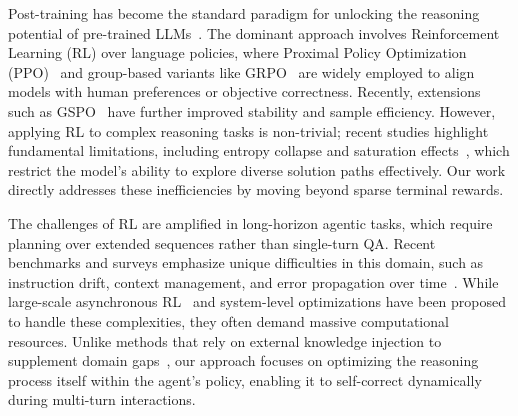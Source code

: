 \documentclass{article}
\theoremstyle{plain}
\theoremstyle{definition}
\theoremstyle{remark}
\begin{document}
Post-training has become the standard paradigm for unlocking the reasoning potential of pre-trained LLMs~\cite{openai2024gpt4technicalreport,llama3herdmodels}. The dominant approach involves Reinforcement Learning (RL) over language policies, where Proximal Policy Optimization (PPO)~\cite{proximalpolicyoptimizationalgorithms} and group-based variants like GRPO~\cite{deepseekmath} are widely employed to align models with human preferences or objective correctness. Recently, extensions such as GSPO~\cite{groupsequencepolicyoptimization} have further improved stability and sample efficiency. However, applying RL to complex reasoning tasks is non-trivial; recent studies highlight fundamental limitations, including entropy collapse and saturation effects~\cite{cui2025entropymechanismreinforcementlearning,doesreinforcementlearningreally}, which restrict the model's ability to explore diverse solution paths effectively. Our work directly addresses these inefficiencies by moving beyond sparse terminal rewards.

The challenges of RL are amplified in long-horizon agentic tasks, which require planning over extended sequences rather than single-turn QA. Recent benchmarks and surveys emphasize unique difficulties in this domain, such as instruction drift, context management, and error propagation over time~\cite{singleturnsurveymultiturninteractions,llmslostmultiturnconversation,multichallenge}. While large-scale asynchronous RL~\cite{turnsunlockinglonghorizonagentic} and system-level optimizations have been proposed to handle these complexities, they often demand massive computational resources. Unlike methods that rely on external knowledge injection to supplement domain gaps~\cite{ovadia-etal-2024-fine,song-etal-2025-injecting}, our approach focuses on optimizing the reasoning process itself within the agent's policy, enabling it to self-correct dynamically during multi-turn interactions.
\end{document}
